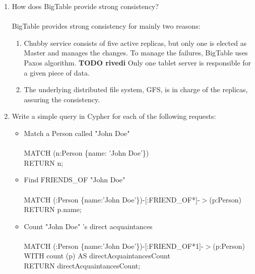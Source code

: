 \documentclass[]{report}
\begin{document}
\begin{enumerate}
 
 \item How does BigTable provide strong consistency?\\\\
 BigTable provides strong consistency for mainly two reasons:
\begin{enumerate}
    \item Chubby service consists of five active replicas, but only one is elected as Master and manages the changes. 
    To manage the failures, BigTable uses Paxos algorithm. \textbf{TODO rivedi}
    Only one tablet server is responsible for a given piece of data. 
    \item The underlying distributed file system, GFS, is in charge of the replicas, assuring the consistency.
\end{enumerate}
 
 \item Write a simple query in Cypher for each of the following requests:
 \begin{itemize}
    	\item Match a Person called "John Doe"\\\\
	MATCH (n:Person \{name: 'John Doe'\})\\
        RETURN n;\\
        \item Find FRIENDS\_OF "John Doe"\\\\
        MATCH (:Person \{name:'John Doe'\})-[:FRIEND\_OF*]-$>$(p:Person)\\
        RETURN p.name;\\
        \item Count "John Doe" 's direct acquaintances\\\\
     	MATCH (:Person \{name:'John Doe'\})-[:FRIEND\_OF*1]-$>$(p:Person)\\
	WITH count (p) AS directAcquaintancesCount\\
        RETURN directAcquaintancesCount;\\
  \end{itemize}

\end{enumerate}
\end{document}
